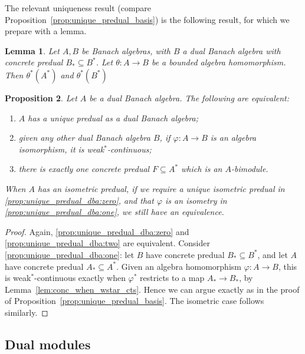 \documentclass[a4paper,11pt]{article}
\theoremstyle{plain}
\newtheorem{proposition}{Proposition}[section]
\newtheorem{lemma}[proposition]{Lemma}
\theoremstyle{remark}
\begin{document}
The relevant uniqueness result (compare Proposition~\ref{prop:unique_predual_basis}) is the following result, for which we prepare with a lemma.

\begin{lemma}
Let $A, B$ be Banach algebras, with $B$ a dual Banach algebra with concrete predual $B_* \subseteq B^*$.  Let $\theta \colon A \to B$ be a bounded algebra homomorphism.  Then $\theta^*(A^*)$ and $\theta^*(B^*)$ 
\end{lemma}


\begin{proposition}\label{prop:unique_predual_dba}
Let $A$ be a dual Banach algebra.  The following are equivalent:
\begin{enumerate}[(1)]
  \item\label{prop:unique_predual_dba:zero}
  $A$ has a unique predual as a dual Banach algebra;
  \item\label{prop:unique_predual_dba:one}
  given any other dual Banach algebra $B$, if $\varphi \colon A \to B$ is an algebra isomorphism, it is weak$^*$-continuous;
  \item\label{prop:unique_predual_dba:two}
  there is exactly one concrete predual $F \subseteq A^*$ which is an $A$-bimodule.
\end{enumerate}
When $A$ has an isometric predual, if we require a unique isometric predual in \ref{prop:unique_predual_dba:zero}, and that $\varphi$ is an isometry in \ref{prop:unique_predual_dba:one}, we still have an equivalence.
\end{proposition}
\begin{proof}
Again, \ref{prop:unique_predual_dba:zero} and \ref{prop:unique_predual_dba:two} are equivalent.  Consider \ref{prop:unique_predual_dba:one}: let $B$ have concrete predual $B_* \subseteq B^*$, and let $A$ have concrete predual $A_* \subseteq A^*$.  Given an algebra homomorphism $\varphi \colon A \to B$, this is weak$^*$-continuous exactly when $\varphi^*$ restricts to a map $A_* \to B_*$, by Lemma~\ref{lem:conc_when_wstar_cts}.  Hence we can argue exactly as in the proof of Proposition~\ref{prop:unique_predual_basis}.  The isometric case follows similarly.
\end{proof}



\subsection{Dual modules}\label{sec:dual_mods}
\end{document}

